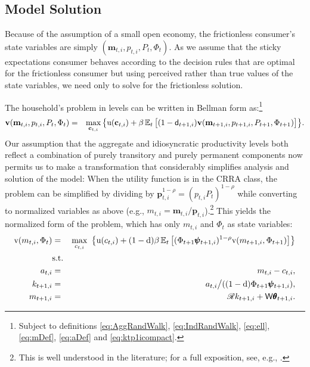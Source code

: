\documentclass[titlepage]{./econtex}
\begin{document}
\subsection{Model Solution}

Because of the assumption of a small open economy, the frictionless consumer's state variables are simply $(\mathbf{m}_{t,i},p_{t,i},P_t,\Phi_t)$.  As we assume that the sticky expectations consumer behaves according to the decision rules that are optimal for the frictionless consumer but using perceived rather than true values of the state variables, we need only to solve for the frictionless solution.

The household's problem in levels can be written in Bellman form as:\footnote{Subject to definitions \eqref{eq:AggRandWalk}, \eqref{eq:IndRandWalk}, \eqref{eq:ell}, \eqref{eq:mDef}, \eqref{eq:aDef} and \eqref{eq:ktp1icompact}.}
\begin{eqnarray*}
\textbf{v}(\mathbf{m}_{t,i},p_{t,i},P_t,\Phi_t)  & = &  \max_{\mathbf{c}_{t,i}}  \big\{ {\mathrm{u}}(\mathbf{c}_{t,i}) + \beta \operatorname{\mathbb{E}}_t \big[(1-\mathsf{d}_{t+1,i})\textbf{v}(\mathbf{m}_{t+1,i},p_{t+1,i},P_{t+1},\Phi_{t+1})\big] \big\}. \nonumber
\end{eqnarray*}
Our assumption that the aggregate and idiosyncratic productivity levels both reflect a combination of purely transitory and purely permanent components now permits us to make a transformation that considerably simplifies analysis and solution of the model: When the utility function is in the CRRA class, the problem can be simplified by dividing by $\pmb{p}_{t,i}^{1-\rho} = (p_{t,i}P_t)^{1-\rho}$ while converting to normalized variables as above (e.g., $m_{t,i}=\mathbf{m}_{t,i}/\pmb{p}_{t,i}$).\footnote{This is well understood in the literature; for a full exposition, see, e.g., \cite{BufferStockTheory}.}  This yields the normalized form of the problem, which has only $m_{t,i}$ and $\Phi_t$ as state variables:
\begin{eqnarray}
    \mathrm{v}({m}_{t,i},\Phi_t) & = & \max_{c_{t,i}} ~ \big\{ {\mathrm{u}}(c_{t,i}) + (1-\mathrm{d}) \beta
    \operatorname{\mathbb{E}}_{t}\big[ (\Phi_{t+1} \pmb{\psi}_{t+1,i})^{1-\rho}\mathrm{v}(m_{t+1,i},\Phi_{t+1})\big] \big\}
    \label{eq:scaledv}
\\  & \mbox{s.t.} & \nonumber
\\    a_{t,i}   & = & m_{t,i} - c_{t,i}, \nonumber
\\    k_{t+1,i} & = & a_{t,i} \big/( (1-\mathrm{d}) \Phi_{t+1} \pmb{\psi}_{t+1,i} ),  \nonumber
\\    m_{t+1,i} & = & \mathscr{R} k_{t+1,i} + \mathsf{W} \pmb{\theta}_{t+1,i}.  \nonumber
\end{eqnarray}
 
\end{document}
